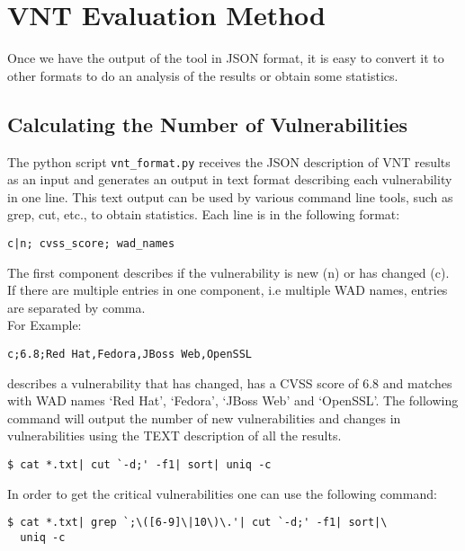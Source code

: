 \chapter{VNT Evaluation Method}
\label{vnt_evaluation_method}
Once we have the output of the tool in JSON format, it is easy to convert it to other formats to do an analysis of the results or obtain some statistics. 
\section{Calculating the Number of Vulnerabilities}
The python script \texttt{vnt\_format.py} receives the JSON description of VNT results as an input and generates an output in text format describing each vulnerability in one line. This text output can be used by various command line tools, such as grep, cut, etc., to obtain statistics. 
Each line is in the following format:
\begin{framed}

\texttt{c|n;%
cvss\_score;%
wad\_names
}

\end{framed}
The first component describes if the vulnerability is new (n) or has changed (c). If there are multiple entries in one component, i.e multiple WAD names, entries are separated by comma.
\\
For Example:
\begin{framed}
\texttt{c;6.8;Red Hat,Fedora,JBoss Web,OpenSSL}
\end{framed}
describes a vulnerability that has changed, has a CVSS score of 6.8 and matches with WAD names `Red Hat', `Fedora', `JBoss Web' and `OpenSSL'.
The following command will output the number of new vulnerabilities and changes in vulnerabilities using the TEXT description of all the results. 
\begin{framed}
\begin{verbatim}
$ cat *.txt| cut `-d;' -f1| sort| uniq -c
\end{verbatim}
\end{framed}
In order to get the critical vulnerabilities one can use the following command:
\begin{framed}
\begin{verbatim}
$ cat *.txt| grep `;\([6-9]\|10\)\.'| cut `-d;' -f1| sort|\
  uniq -c
\end{verbatim}
\end{framed}
